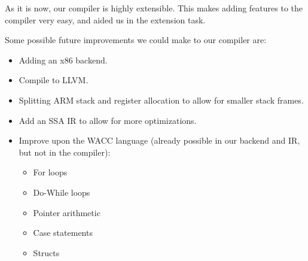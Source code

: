 \documentclass{article}
\begin{document}
        As it is now, our compiler is highly extensible. This makes adding features to the compiler very easy, and aided us in the extension task.
        
        Some possible future improvements we could make to our compiler are:
        \begin{itemize}
            \item Adding an x86 backend.
            \item Compile to LLVM.
            \item Splitting ARM stack and register allocation to allow for smaller stack frames.
            \item Add an SSA IR to allow for more optimizations.
            \item Improve upon the WACC language (already possible in our backend and IR, but not in the compiler):
                \begin{itemize}
                    \item For loops
                    \item Do-While loops
                    \item Pointer arithmetic
                    \item Case statements
                    \item Structs
                \end{itemize}
        \end{itemize}
\end{document}
